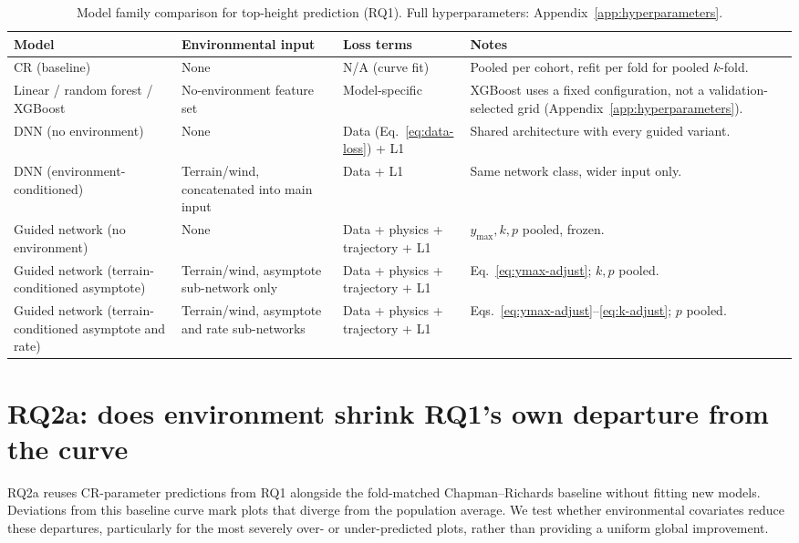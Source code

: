 \documentclass[11pt,a4paper]{report}
\begin{document}
\begin{table}[!htbp]
\scriptsize
\renewcommand{\arraystretch}{1.2}
\begin{tabular}{p{3.2cm}p{3cm}p{2.6cm}p{4.5cm}}
\toprule
Model & Environmental input & Loss terms & Notes \\
\midrule
CR (baseline) & None & N/A (curve fit) & Pooled per cohort, refit per fold for pooled $k$-fold. \\
Linear / random forest / XGBoost & No-environment feature set & Model-specific & XGBoost uses a
fixed configuration, not a validation-selected grid (Appendix~\ref{app:hyperparameters}). \\
DNN (no environment) & None & Data (Eq.~\ref{eq:data-loss}) + L1 & Shared architecture with every
guided variant. \\
DNN (environment-conditioned) & Terrain/wind, concatenated into main input & Data + L1 & Same
network class, wider input only. \\
Guided network (no environment) & None & Data + physics + trajectory + L1 & $y_{\max},k,p$
pooled, frozen. \\
Guided network (terrain-conditioned asymptote) & Terrain/wind, asymptote sub-network only & Data +
physics + trajectory + L1 & Eq.~\ref{eq:ymax-adjust}; $k,p$ pooled. \\
Guided network (terrain-conditioned asymptote and rate) & Terrain/wind, asymptote and rate
sub-networks & Data + physics + trajectory + L1 & Eqs.~\ref{eq:ymax-adjust}--\ref{eq:k-adjust};
$p$ pooled. \\
\bottomrule
\end{tabular}
\caption{Model family comparison for top-height prediction (RQ1). Full hyperparameters:
Appendix~\ref{app:hyperparameters}.}
\label{tab:rq1-models}
\end{table}

\section{RQ2a: does environment shrink RQ1's own departure from the curve}
RQ2a reuses CR-parameter predictions from RQ1 alongside the fold-matched Chapman--Richards baseline without fitting new models. Deviations from this baseline curve mark plots that diverge from the population average. We test whether environmental covariates reduce these departures, particularly for the most severely over- or under-predicted plots, rather than providing a uniform global improvement.
\end{document}

